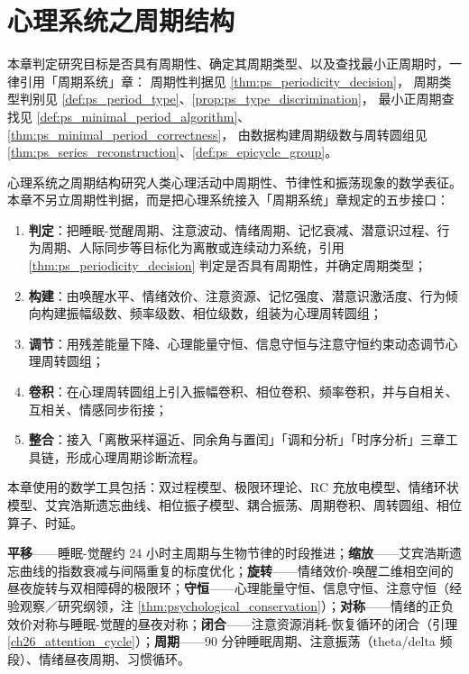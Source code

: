 \chapter{心理系统之周期结构}

\begin{remark}[本章目标的周期性判定（引用）]\label{rem:psych_ps_hook}
本章判定研究目标是否具有周期性、确定其周期类型、以及查找最小正周期时，一律引用「周期系统」章：
周期性判据见 \cref{thm:ps_periodicity_decision}，
周期类型判别见 \cref{def:ps_period_type}、\cref{prop:ps_type_discrimination}，
最小正周期查找见 \cref{def:ps_minimal_period_algorithm}、\cref{thm:ps_minimal_period_correctness}，
由数据构建周期级数与周转圆组见 \cref{thm:ps_series_reconstruction}、\cref{def:ps_epicycle_group}。
\end{remark}

\begin{remark}\label{rem:psych_five_steps_positioning}
心理系统之周期结构研究人类心理活动中周期性、节律性和振荡现象的数学表征。本章不另立周期性判据，而是把心理系统接入「周期系统」章规定的五步接口：
\begin{enumerate}[label=(\arabic*)]
    \item \textbf{判定}：把睡眠-觉醒周期、注意波动、情绪周期、记忆衰减、潜意识过程、行为周期、人际同步等目标化为离散或连续动力系统，引用 \cref{thm:ps_periodicity_decision} 判定是否具有周期性，并确定周期类型；
    \item \textbf{构建}：由唤醒水平、情绪效价、注意资源、记忆强度、潜意识激活度、行为倾向构建振幅级数、频率级数、相位级数，组装为心理周转圆组；
    \item \textbf{调节}：用残差能量下降、心理能量守恒、信息守恒与注意守恒约束动态调节心理周转圆组；
    \item \textbf{卷积}：在心理周转圆组上引入振幅卷积、相位卷积、频率卷积，并与自相关、互相关、情感同步衔接；
    \item \textbf{整合}：接入「离散采样逼近、同余角与置闰」「调和分析」「时序分析」三章工具链，形成心理周期诊断流程。
\end{enumerate}
本章使用的数学工具包括：双过程模型、极限环理论、RC 充放电模型、情绪环状模型、艾宾浩斯遗忘曲线、相位振子模型、耦合振荡、周期卷积、周转圆组、相位算子、时延。
\end{remark}

\begin{remark}[本章七主题导引]\label{rem:psych_seven_themes}
\textbf{平移}——睡眠-觉醒约 24 小时主周期与生物节律的时段推进；\textbf{缩放}——艾宾浩斯遗忘曲线的指数衰减与间隔重复的标度优化；\textbf{旋转}——情绪效价-唤醒二维相空间的昼夜旋转与双相障碍的极限环；\textbf{守恒}——心理能量守恒、信息守恒、注意守恒（经验观察／研究纲领，注 \ref{thm:psychological_conservation}）；\textbf{对称}——情绪的正负效价对称与睡眠-觉醒的昼夜对称；\textbf{闭合}——注意资源消耗-恢复循环的闭合（引理 \ref{ch26_attention_cycle}）；\textbf{周期}——90 分钟睡眠周期、注意振荡（theta/delta 频段）、情绪昼夜周期、习惯循环。
\end{remark}

